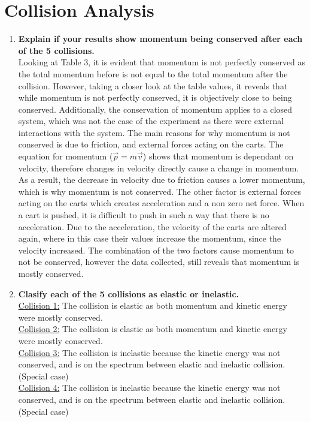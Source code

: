 \documentclass[12pt,letterpaper]{article}
\begin{document}
\section{Collision Analysis}
\begin{enumerate}
	\item \textbf{Explain if your results show momentum being conserved after each of the 5 collisions.}\\
	      Looking at Table 3, it is evident that momentum is not perfectly conserved as the total momentum before is not equal to the total momentum after the collision.
	      However, taking a closer look at the table values, it reveals that while momentum is not perfectly conserved, it is objectively close to being conserved.
	      Additionally, the conservation of momentum applies to a closed system, which was not the case of the experiment as there were external interactions with the system.
	      The main reasons for why momentum is not conserved is due to friction, and external forces acting on the carts.
	      The equation for momentum ($\vec{p} = m\vec{v}$) shows that momentum is dependant on velocity, therefore changes in velocity directly cause a change in momentum.
	      As a result, the decrease in velocity due to friction causes a lower momentum, which is why momentum is not conserved.
	      The other factor is external forces acting on the carts which creates acceleration and a non zero net force.
	      When a cart is pushed, it is difficult to push in such a way that there is no acceleration.
	      Due to the acceleration, the velocity of the carts are altered again, where in this case their values increase the momentum, since the velocity increased.
	      The combination of the two factors cause momentum to not be conserved, however the data collected, still reveals that momentum is mostly conserved.
	\item \textbf{Clasify each of the 5 collisions as elastic or inelastic.}\\
	      \underline{Collision 1:} The collision is elastic as both momentum and kinetic energy were mostly conserved.\\
	      \underline{Collision 2:} The collision is elastic as both momentum and kinetic energy were mostly conserved.\\
	      \underline{Collision 3:} The collision is inelastic because the kinetic energy was not conserved, and is on the spectrum between elastic and inelastic collision. (Special case)\\
	      \underline{Collision 4:} The collision is inelastic because the kinetic energy was not conserved, and is on the spectrum between elastic and inelastic collision. (Special case) \\

\end{enumerate}
\end{document}
